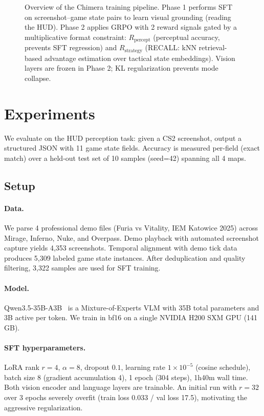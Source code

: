 \documentclass{article}
\begin{document}
\begin{figure}[t]
\centering
{}
\caption{Overview of the Chimera training pipeline. Phase 1 performs SFT on screenshot--game state pairs to learn visual grounding (reading the HUD). Phase 2 applies GRPO with 2 reward signals gated by a multiplicative format constraint: $R_\text{percept}$ (perceptual accuracy, prevents SFT regression) and $R_\text{strategy}$ (RECALL: kNN retrieval-based advantage estimation over tactical state embeddings). Vision layers are frozen in Phase 2; KL regularization prevents mode collapse.}
\label{fig:architecture}
\end{figure}

\section{Experiments}
\label{sec:experiments}

We evaluate on the HUD perception task: given a CS2 screenshot, output a structured JSON with 11 game state fields. Accuracy is measured per-field (exact match) over a held-out test set of 10 samples (seed=42) spanning all 4 maps.

\subsection{Setup}
\label{sec:setup}

\paragraph{Data.} We parse 4 professional demo files (Furia vs Vitality, IEM Katowice 2025) across Mirage, Inferno, Nuke, and Overpass. Demo playback with automated screenshot capture yields 4{,}353 screenshots. Temporal alignment with demo tick data produces 5{,}309 labeled game state instances. After deduplication and quality filtering, 3{,}322 samples are used for SFT training.

\paragraph{Model.} Qwen3.5-35B-A3B~\cite{yang2024qwen2} is a Mixture-of-Experts VLM with 35B total parameters and 3B active per token. We train in bf16 on a single NVIDIA H200 SXM GPU (141\,GB).

\paragraph{SFT hyperparameters.} LoRA rank $r{=}4$, $\alpha{=}8$, dropout $0.1$, learning rate $1 \times 10^{-5}$ (cosine schedule), batch size 8 (gradient accumulation 4), 1 epoch (304 steps), 1h40m wall time. Both vision encoder and language layers are trainable. An initial run with $r{=}32$ over 3 epochs severely overfit (train loss 0.033 / val loss 17.5), motivating the aggressive regularization.
\end{document}
